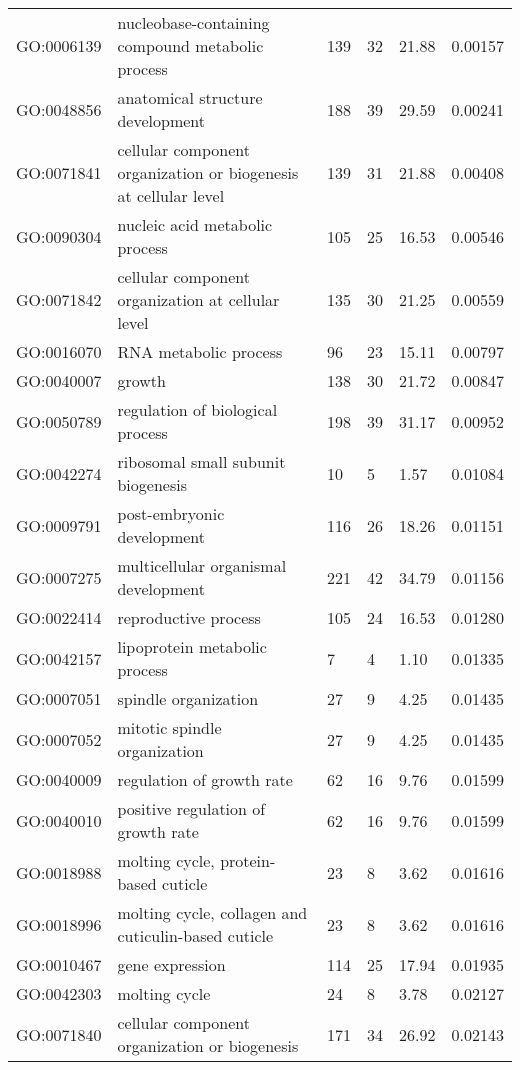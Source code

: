 \documentclass[10pt]{bmc_article}
\newenvironment{bmcformat}{\begin{raggedright}\baselineskip20pt\sloppy\setboolean{publ}{false}}{\end{raggedright}\baselineskip20pt\sloppy}
\begin{document}
\begin{bmcformat}
\begin{longtable}{lp{3cm}llll}
  GO:0006139 & nucleobase-containing compound metabolic process & 139 &  32 & 21.88 & 0.00157 \\ 
  GO:0048856 & anatomical structure development & 188 &  39 & 29.59 & 0.00241 \\ 
  GO:0071841 & cellular component organization or biogenesis at cellular level & 139 &  31 & 21.88 & 0.00408 \\ 
  GO:0090304 & nucleic acid metabolic process & 105 &  25 & 16.53 & 0.00546 \\ 
  GO:0071842 & cellular component organization at cellular level & 135 &  30 & 21.25 & 0.00559 \\ 
  GO:0016070 & RNA metabolic process &  96 &  23 & 15.11 & 0.00797 \\ 
  GO:0040007 & growth & 138 &  30 & 21.72 & 0.00847 \\ 
  GO:0050789 & regulation of biological process & 198 &  39 & 31.17 & 0.00952 \\ 
  GO:0042274 & ribosomal small subunit biogenesis &  10 &   5 & 1.57 & 0.01084 \\ 
  GO:0009791 & post-embryonic development & 116 &  26 & 18.26 & 0.01151 \\ 
  GO:0007275 & multicellular organismal development & 221 &  42 & 34.79 & 0.01156 \\ 
  GO:0022414 & reproductive process & 105 &  24 & 16.53 & 0.01280 \\ 
  GO:0042157 & lipoprotein metabolic process &   7 &   4 & 1.10 & 0.01335 \\ 
  GO:0007051 & spindle organization &  27 &   9 & 4.25 & 0.01435 \\ 
  GO:0007052 & mitotic spindle organization &  27 &   9 & 4.25 & 0.01435 \\ 
  GO:0040009 & regulation of growth rate &  62 &  16 & 9.76 & 0.01599 \\ 
  GO:0040010 & positive regulation of growth rate &  62 &  16 & 9.76 & 0.01599 \\ 
  GO:0018988 & molting cycle, protein-based cuticle &  23 &   8 & 3.62 & 0.01616 \\ 
  GO:0018996 & molting cycle, collagen and cuticulin-based cuticle &  23 &   8 & 3.62 & 0.01616 \\ 
  GO:0010467 & gene expression & 114 &  25 & 17.94 & 0.01935 \\ 
  GO:0042303 & molting cycle &  24 &   8 & 3.78 & 0.02127 \\ 
  GO:0071840 & cellular component organization or biogenesis & 171 &  34 & 26.92 & 0.02143 \\ 

\end{longtable}
\end{bmcformat}
\end{document}
